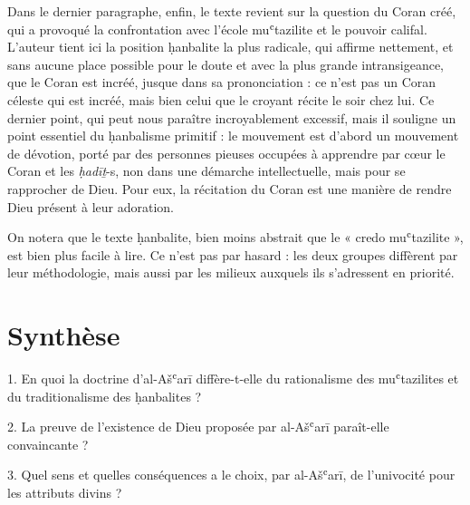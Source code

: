 Dans le dernier paragraphe, enfin, le texte revient sur la question du
Coran créé, qui a provoqué la confrontation avec l'école muʿtazilite et
le pouvoir califal. L'auteur tient ici la position ḥanbalite la plus
radicale, qui affirme nettement, et sans aucune place possible pour le
doute et avec la plus grande intransigeance, que le Coran est incréé,
jusque dans sa prononciation : ce n'est pas un Coran céleste qui est
incréé, mais bien celui que le croyant récite le soir chez lui. Ce
dernier point, qui peut nous paraître incroyablement excessif, mais il
souligne un point essentiel du ḥanbalisme primitif : le mouvement est
d'abord un mouvement de dévotion, porté par des personnes pieuses
occupées à apprendre par cœur le
Coran et les \emph{ḥadīṯ}-s, non dans une démarche intellectuelle, mais
pour se rapprocher de Dieu. Pour eux, la récitation du Coran est une
manière de rendre Dieu présent à leur adoration.

On notera que le texte ḥanbalite, bien moins abstrait que le « credo
muʿtazilite », est bien plus facile à lire. Ce n'est pas par hasard :
les deux groupes diffèrent par leur méthodologie, mais aussi par les
milieux auxquels ils s'adressent en priorité.

\section{Synthèse}
  1. En quoi la doctrine d’al-Ašʿarī diffère-t-elle du rationalisme des muʿtazilites et du traditionalisme des ḥanbalites ?  
  
  
  2. La preuve de l’existence de Dieu proposée par al-Ašʿarī paraît-elle convaincante ?  
  
  
  3. Quel sens et quelles conséquences a le choix, par al-Ašʿarī, de l’univocité pour les attributs divins ? 
